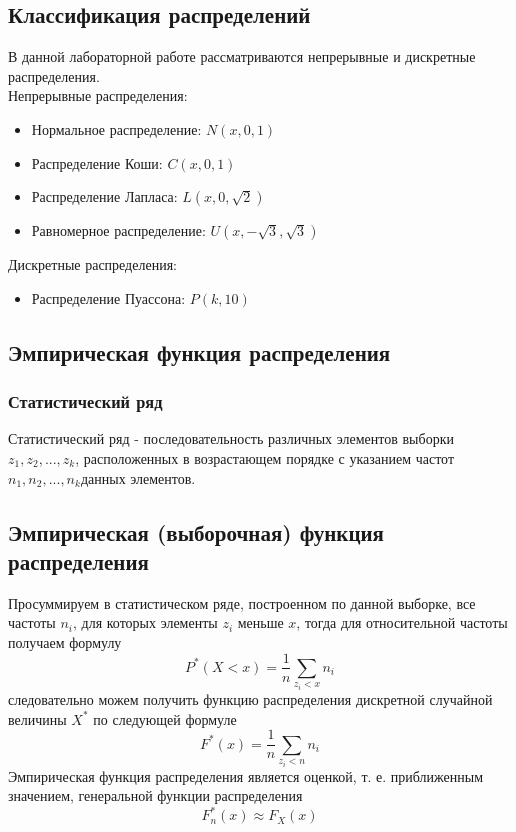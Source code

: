 \documentclass{article}
\begin{document}
\subsection{Классификация распределений}
В данной лабораторной работе рассматриваются непрерывные и дискретные распределения. \\
Непрерывные распределения:
\begin{itemize}
    \item Нормальное распределение: $N(x,0,1)$
    \item Распределение Коши: $C(x,0,1)$
    \item Распределение Лапласа: $L(x,0,\sqrt{2})$
    \item Равномерное распределение: $U(x,-\sqrt{3}, \sqrt{3})$
\end{itemize}
Дискретные распределения:
\begin{itemize}
    \item Распределение Пуассона: $P(k,10)$
\end{itemize}

\subsection{Эмпирическая функция распределения}

\subsubsection{Статистический ряд}

Статистический ряд - последовательность различных элементов выборки $z_1, z_2,..., z_k$, расположенных в возрастающем порядке с указанием частот $n_1, n_2,..., n_k$данных элементов. 

\subsection{Эмпирическая (выборочная) функция распределения}

Просуммируем в статистическом ряде, построенном по данной выборке, все частоты $n_i$, для которых элементы $z_i$ меньше $x$, тогда для относительной частоты получаем формулу
$$
P^*(X < x) =\frac{1}{n}\sum_{z_i<x}n_i
$$
следовательно можем получить функцию распределения дискретной случайной величины $X^*$ по следующей формуле
$$
F^*(x) = \frac{1}{n} \sum_{z_i < n} n_i
$$
Эмпирическая функция распределения является оценкой, т. е. приближенным значением, генеральной функции распределения
$$
F_n  ^*(x) \approx F_X(x)
$$
\end{document}
